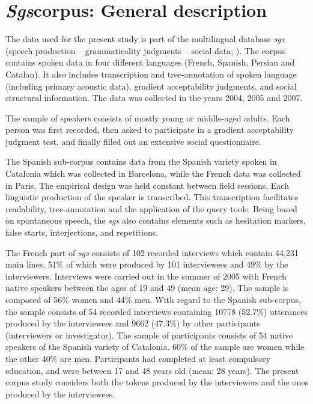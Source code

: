 \section{\textit{Sgs}corpus: General description} \label{sub:4.2}

The data used for the present study is part of the multilingual database \textit{sgs} (speech production -- grammaticality judgments -- social data; \cite{adli2011gradient}). The corpus contains spoken data in four different languages (French, Spanish, Persian and Catalan). It also includes transcription and tree-annotation of spoken language (including primary acoustic data), gradient acceptability judgments, and social structural information. The data was collected in the years 2004, 2005 and 2007. 

The sample of speakers consists of mostly young or middle-aged adults. Each person was first recorded, then asked to participate in a gradient acceptability judgment test, and finally filled out an extensive social questionnaire. 

The Spanish sub-corpus contains data from the Spanish variety spoken in Catalonia which was collected in Barcelona, while the French data was collected in Paris. The empirical design was held constant between field sessions. Each linguistic production of the speaker is transcribed. This transcription facilitates  readability, tree-annotation and the application of the query tools. Being based on spontaneous speech, the \textit{sgs} also contains elements such as hesitation markers, false starts, interjections, and repetitions. 

The French part of \textit{sgs} consists of 102 recorded interviews which contain 44,231 main lines, 51\% of which were produced by 101 interviewees and 49\% by the interviewers. Interviews were carried out in the summer of 2005 with French native speakers between the ages of 19 and 49 (mean age: 29). The sample is composed of 56\% women and 44\% men. 
With regard to the Spanish sub-corpus, the sample consists of 54 recorded interviews containing 10778 (52.7\%) utterances produced by the interviewees and 9662 (47.3\%) by other participants (interviewers or investigator). The sample of participants consists of 54 native speakers of the Spanish variety of Catalonia. 60\% of the sample are women while the other 40\% are men. Participants had completed at least compulsory education, and were between 17 and 48 years old (mean: 28 years). 
The present corpus study considers both the tokens produced by the interviewers and the ones produced by the interviewees.

